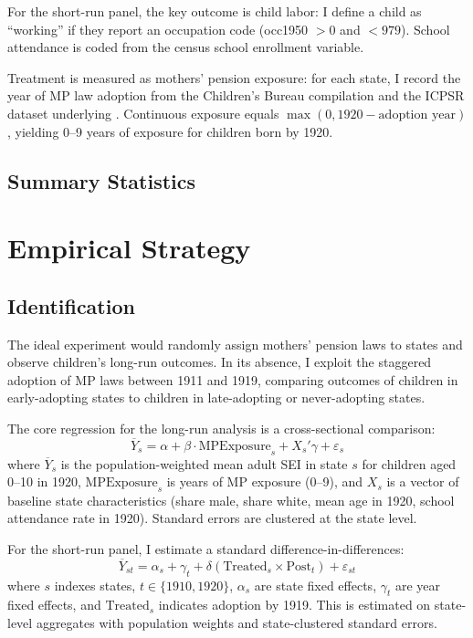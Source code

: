 \documentclass[12pt]{article}
\begin{document}
For the short-run panel, the key outcome is child labor: I define a child as ``working'' if they report an occupation code (occ1950 $> 0$ and $< 979$). School attendance is coded from the census school enrollment variable.

Treatment is measured as mothers' pension exposure: for each state, I record the year of MP law adoption from the Children's Bureau compilation \citep{thompson1919} and the ICPSR dataset underlying \citet{aizer2016}. Continuous exposure equals $\max(0, 1920 - \text{adoption year})$, yielding 0--9 years of exposure for children born by 1920.

\subsection{Summary Statistics}




\section{Empirical Strategy}

\subsection{Identification}

The ideal experiment would randomly assign mothers' pension laws to states and observe children's long-run outcomes. In its absence, I exploit the staggered adoption of MP laws between 1911 and 1919, comparing outcomes of children in early-adopting states to children in late-adopting or never-adopting states.

The core regression for the long-run analysis is a cross-sectional comparison:
\begin{equation}
\overline{Y}_{s} = \alpha + \beta \cdot \text{MPExposure}_s + X_s'\gamma + \varepsilon_s
\label{eq:longrun}
\end{equation}
where $\overline{Y}_s$ is the population-weighted mean adult SEI in state $s$ for children aged 0--10 in 1920, $\text{MPExposure}_s$ is years of MP exposure (0--9), and $X_s$ is a vector of baseline state characteristics (share male, share white, mean age in 1920, school attendance rate in 1920). Standard errors are clustered at the state level.

For the short-run panel, I estimate a standard difference-in-differences:
\begin{equation}
\overline{Y}_{st} = \alpha_s + \gamma_t + \delta(\text{Treated}_s \times \text{Post}_t) + \varepsilon_{st}
\label{eq:shortrun}
\end{equation}
where $s$ indexes states, $t \in \{1910, 1920\}$, $\alpha_s$ are state fixed effects, $\gamma_t$ are year fixed effects, and $\text{Treated}_s$ indicates adoption by 1919. This is estimated on state-level aggregates with population weights and state-clustered standard errors.
\end{document}
